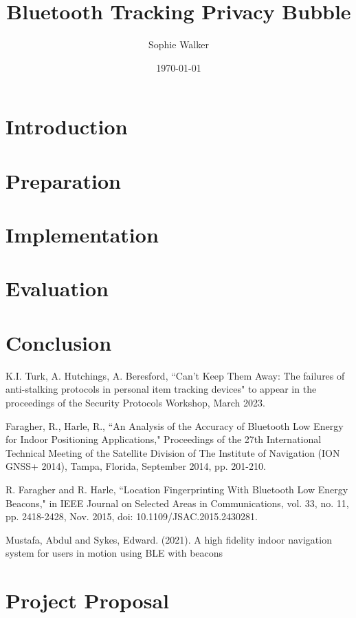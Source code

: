 \documentclass[12pt]{report}
\begin{document}
\title{Bluetooth Tracking Privacy Bubble}
\author{Sophie Walker}
\date{\today}
\maketitle
\newpage
\tableofcontents

\chapter{Introduction}

\chapter{Preparation}


\chapter{Implementation}

\chapter{Evaluation}


\chapter{Conclusion}




\begin{thebibliography}{9}
\frenchspacing
{} K.I. Turk, A. Hutchings, A. Beresford, ``Can’t Keep Them Away: The failures of anti-stalking protocols in personal item tracking devices" to appear in the proceedings of the Security Protocols Workshop, March 2023.


 Faragher, R., Harle, R., ``An Analysis of the Accuracy of Bluetooth Low Energy for Indoor Positioning Applications," Proceedings of the 27th International Technical Meeting of the Satellite Division of The Institute of Navigation (ION GNSS+ 2014), Tampa, Florida, September 2014, pp. 201-210.


R. Faragher and R. Harle, ``Location Fingerprinting With Bluetooth Low Energy Beacons," in IEEE Journal on Selected Areas in Communications, vol. 33, no. 11, pp. 2418-2428, Nov. 2015, doi: 10.1109/JSAC.2015.2430281.


 Mustafa, Abdul and Sykes, Edward. (2021). A high fidelity indoor navigation system for users in motion using BLE with beacons
\end{thebibliography}
\appendix
\chapter{Project Proposal}

 
\end{document}
